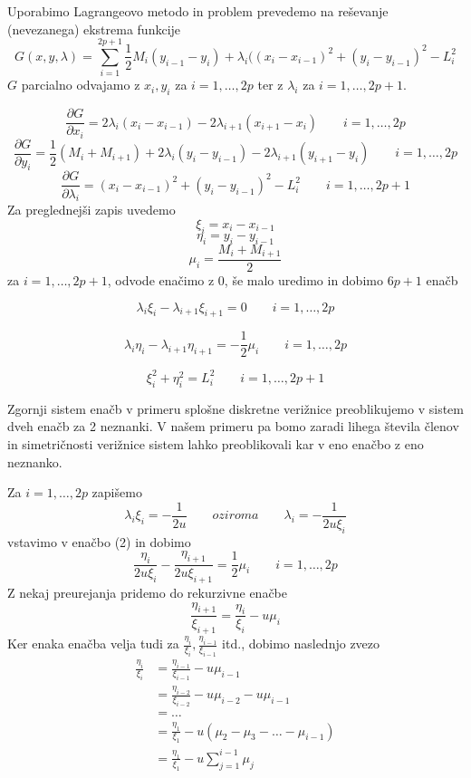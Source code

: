 \documentclass[A4paper, 11pt]{article}
\begin{document}
Uporabimo Lagrangeovo metodo in problem prevedemo na reševanje (nevezanega) ekstrema funkcije
\[ G(x,y,\lambda) = \sum_{i=1}^{2p+1} \frac{1}{2} M_i (y_{i-1} - y_i) + \lambda_i ((x_i - x_{i-1})^2 + (y_i - y_{i-1})^2 - L_i ^2 \]
$G$ parcialno odvajamo z $x_i, y_i$ za $i=1, \ldots, 2p$ ter z $\lambda_i$ za $i=1, \ldots, 2p+1$.

\[ \frac{\partial G}{\partial x_i} = 2\lambda_i (x_i - x_{i-1}) - 2\lambda_{i+1} (x_{i+1} - x_i) \qquad i=1, \ldots, 2p \]
\[ \frac{\partial G}{\partial y_i} = \frac{1}{2} (M_i + M_{i+1}) + 2\lambda_i (y_i - y_{i-1}) - 2\lambda_{i+1} (y_{i+1} - y_i) \qquad  i=1, \ldots, 2p \]
\[ \frac{\partial G}{\partial \lambda_i} = (x_i - x_{i-1})^2 + (y_i - y_{i-1})^2 - L_i ^2 \qquad i=1, \ldots, 2p+1 \]
Za preglednejši zapis uvedemo 
\[ \xi_i = x_i - x_{i-1} \]
\[ \eta_i = y_i - y_{i-1} \]
\[ \mu_i = \frac{M_i + M_{i+1}}{2} \] 
za $i=1, \ldots, 2p+1$, odvode enačimo z 0, še malo uredimo in dobimo $6p+1$ enačb

\begin{equation}
\lambda_i \xi_i - \lambda_{i+1} \xi_{i+1} = 0 \qquad i=1, \ldots, 2p 
\end{equation}

\begin{equation}
\lambda_i \eta_i - \lambda_{i+1} \eta_{i+1} = - \frac{1}{2} \mu_i \qquad i=1, \ldots, 2p 
\end{equation}

\begin{equation}
\xi_i ^2 + \eta_i ^2 = L_i ^2 \qquad i=1, \ldots, 2p+1 
\end{equation}

Zgornji sistem enačb v primeru splošne diskretne verižnice preoblikujemo v sistem dveh enačb za 2 neznanki. V našem primeru pa bomo zaradi lihega števila členov in simetričnosti verižnice sistem lahko preoblikovali kar v eno enačbo z eno neznanko. 

Za $i=1, \ldots, 2p$ zapišemo
\[ \lambda_i \xi_i = - \frac{1}{2u} \qquad oziroma \qquad \lambda_i = - \frac{1}{2u \xi_i}  \]
vstavimo v enačbo (2) in dobimo
\[ \frac{\eta_i}{2u \xi_i} - \frac{\eta_{i+1}}{2u \xi_{i+1}} = \frac{1}{2} \mu_i \qquad i=1, \ldots, 2p \]
Z nekaj preurejanja pridemo do rekurzivne enačbe
\[ \frac{\eta_{i+1}}{\xi_{i+1}} =  \frac{\eta_i}{\xi_i} - u \mu_i \]
Ker enaka enačba velja tudi za $\frac{\eta_i}{\xi_i}, \frac{\eta_{i-1}}{\xi_{i-1}}$ itd., dobimo naslednjo zvezo
\begin{equation}
\begin{split}
\frac{\eta_{i}}{\xi_{i}} & =  \frac{\eta_{i-1}}{\xi_{i-1}} - u \mu_{i-1}  \\
                                               & =  \frac{\eta_{i-2}}{\xi_{i-2}} - u \mu_{i-2} - u \mu_{i-1}  \\
                                               & = \ldots  \\
                                               & = \frac{\eta_1}{\xi_1} - u (\mu_2 - \mu_3 - \ldots - \mu_{i-1})  \\
                                               & = \frac{\eta_1}{\xi_1} - u \sum_{j=1}^{i-1} \mu_j
\end{split}
\end{equation}
\end{document}
